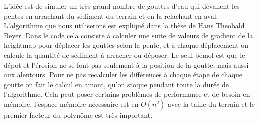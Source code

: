 \documentclass{EPUProjetDi}
\begin{document}
L'idée est de simuler un très grand nombre de gouttes d'eau qui dévallent les pentes en arrachant du sédiment du terrain et en la relachant en aval. L'algorithme que nous utiliserons est expliqué dans la thèse de Hans Theobald Beyer\cite{erosion}.
Dans le code cela consiste à calculer une suite de valeurs de gradient de la heightmap pour déplacer les gouttes selon la pente, et à chaque déplacement on calcule la quantité de sédiment à arracher ou déposer. Le seul bémol est que le dépot et l'érosion ne se font pas seulement à la position de la goutte, mais aussi aux alentours. Pour ne pas recalculer les différences à chaque étape de chaque goutte on fait le calcul en amont, qu'on stoque pendant toute la durée de l'algorithme. Cela peut poser certains problèmes de performance et de besoin en mémoire, l'espace mémoire nécessaire est en $O(n^2)$ avec la taille du terrain et le premier facteur du polynôme est très important.
\end{document}
